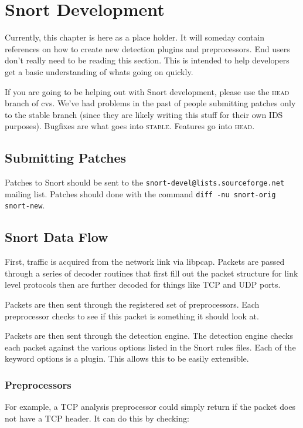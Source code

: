 \documentclass[english]{report}
\begin{document}
\chapter{Snort Development}

Currently, this chapter is here as a place holder. It will someday contain
references on how to create new detection plugins and preprocessors.  End users
don't really need to be reading this section. This is intended to help
developers get a basic understanding of whats going on quickly.

If you are going to be helping out with Snort development, please use the
\textsc{head} branch of cvs. We've had problems in the past of people
submitting patches only to the stable branch (since they are likely writing
this stuff for their own IDS purposes). Bugfixes are what goes into
\textsc{stable}. Features go into \textsc{head}.

\section{Submitting Patches}

Patches to Snort should be sent to the
\verb!snort-devel@lists.sourceforge.net!
mailing list.  Patches should done with the command
\verb!diff -nu snort-orig snort-new!.

\section{Snort Data Flow}

First, traffic is acquired from the network link via libpcap. Packets are
passed through a series of decoder routines that first fill out the packet
structure for link level protocols then are further decoded for things like TCP
and UDP ports.

Packets are then sent through the registered set of preprocessors.  Each
preprocessor checks to see if this packet is something it should look at.

Packets are then sent through the detection engine. The detection engine checks
each packet against the various options listed in the Snort rules files. Each
of the keyword options is a plugin. This allows this to be easily extensible.

\subsection{Preprocessors}

For example, a TCP analysis preprocessor could simply return if the packet does
not have a TCP header. It can do this by checking: 
\end{document}
